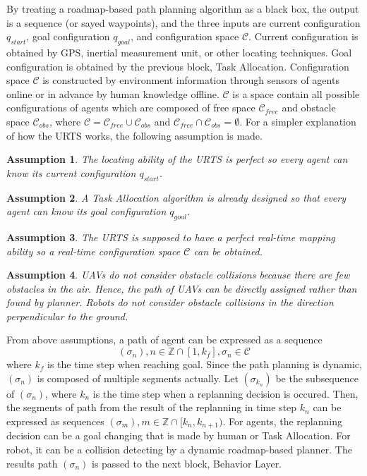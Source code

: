 \documentclass{ieeeaccess}
\newtheorem{assumption}{Assumption}[section]
\begin{document}
By treating a roadmap-based path planning algorithm as a black box, the output is a sequence (or sayed waypoints), and the three inputs are current configuration $q_{start}$, goal configuration $q_{goal}$, and configuration space $\mathcal{C}$. Current configuration is obtained by GPS, inertial measurement unit, or other locating techniques. Goal configuration is obtained by the previous block, Task Allocation. Configuration space $\mathcal{C}$ is constructed by environment information through sensors of agents online or in advance by human knowledge offline. $\mathcal{C}$ is a space contain all possible configurations of agents which are composed of free space $\mathcal{C}_{free}$ and obstacle space $\mathcal{C}_{obs}$, where $\mathcal{C}=\mathcal{C}_{free}\cup\mathcal{C}_{obs}$ and $\mathcal{C}_{free}\cap\mathcal{C}_{obs}=\emptyset$. For a simpler explanation of how the URTS works, the following assumption is made.
\begin{assumption}
    The locating ability of the URTS is perfect so every agent can know its current configuration $q_{start}$.
\end{assumption}
\begin{assumption}
    A Task Allocation algorithm is already designed so that every agent can know its goal configuration $q_{goal}$.
\end{assumption}
\begin{assumption}
    The URTS is supposed to have a perfect real-time mapping ability so a real-time configuration space $\mathcal{C}$ can be obtained.
\end{assumption}
\begin{assumption} \label{asm:collision} %
    UAVs do not consider obstacle collisions because there are few obstacles in the air. Hence, the path of UAVs can be directly assigned rather than found by planner. Robots do not consider obstacle collisions in the direction perpendicular to the ground. 
\end{assumption}
From above assumptions, a path of agent can be expressed as a sequence
\begin{equation}
    (\sigma_n), n\in\mathbb{Z}\cap[1,k_f], \sigma_n\in\mathcal{C}
\end{equation}
where $k_f$ is the time step when reaching goal. Since the path planning is dynamic, $(\sigma_n)$ is composed of multiple segments actually. Let $(\sigma_{k_n})$ be the subsequence of $(\sigma_n)$, where $k_n$ is the time step when a replanning decision is occured. Then, the segments of path from the result of the replanning in time step $k_n$ can be expressed as sequences $(\sigma_m), m\in\mathbb{Z}\cap[k_n, k_{n+1})$. For agents, the replanning decision can be a goal changing that is made by human or Task Allocation. For robot, it can be a collision detecting by a dynamic roadmap-based planner. The results path $(\sigma_n)$ is passed to the next block, Behavior Layer.
\end{document}
